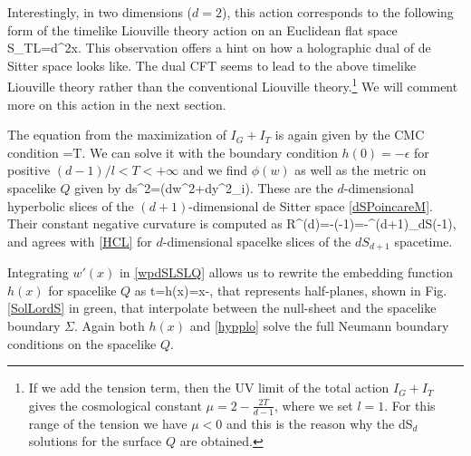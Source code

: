 \documentclass[a4paper,12pt]{article}
\begin{document}
Interestingly, in two dimensions ($d=2$), this action corresponds to the following form of the timelike Liouville theory
action \cite{TL1,TL2,TL3} on an Euclidean flat space
\ba
S_{TL}=\int d^2x. \label{ILactTL}
\ea
This observation offers a hint on how a holographic dual of de Sitter space looks like. The dual CFT  seems to lead to the above timelike Liouville theory rather than the conventional Liouville theory.\footnote{If we add the tension term,
then the UV limit of the total action $I_G+I_T$ gives the cosmological constant $\mu=2-\frac{2T}{d-1}$, where we set $l=1$.  For this range of the tension we have $\mu<0$ and this is the reason why the dS$_{d}$ solutions for the surface $Q$ are obtained.} We will comment more on this action in the next section.

The equation from the maximization of $I_G+I_T$ is again given by the CMC condition
\be
{}=T.
\ee
We can solve it with the boundary condition $h(0)=-\epsilon$ for positive $(d-1)/l<T<+\infty$ and we find $\phi(w)$ as well as the metric on spacelike $Q$ given by
 \be
 ds^2=\left(dw^2+dy^2_i\right).  \label{hypplo}
 \ee
These are the $d$-dimensional hyperbolic slices of the $(d+1)$-dimensional de Sitter space \eqref{dSPoincareM}.
Their constant negative curvature is computed as 
\be
R^{(d)}=-\left(-1\right)=-\Lambda^{(d+1)}_{dS}\left(-1\right),
\ee
and agrees with \eqref{HCL} for $d$-dimensional spacelke slices of the $dS_{d+1}$ spacetime.
 
Integrating $w'(x)$ in \eqref{wpdSLSLQ} allows us to rewrite the embedding function $h(x)$ for spacelike $Q$ as
 \be
 t=h(x)=x-\epsilon,
 \label{dSLSL}
 \ee
 that represents half-planes, shown in Fig. \ref{SolLordS} in green, that interpolate between the null-sheet and the spacelike boundary $\Sigma$. Again both $h(x)$ and \eqref{hypplo} solve the full Neumann boundary conditions on the spacelike $Q$.
 
\end{document}
